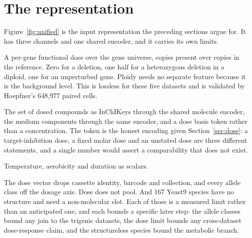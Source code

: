 
\section{The representation}
\label{sec:representation}

Figure~\ref{fig:unified} is the input representation the preceding sections argue for. It has
three channels and one shared encoder, and it carries its own limits.


A per-gene functional dose over the gene universe, copies present over copies in the
reference. Zero for a deletion, one half for a heterozygous deletion in a diploid, one for an
unperturbed gene. Ploidy needs no separate feature because it is the background level. This is
lossless for these five datasets and is validated by Hoepfner's 648{,}977 paired cells.

The set of dosed compounds as InChIKeys through the shared molecule encoder, the medium
components through the same encoder, and a dose basis token rather than a concentration. The
token is the honest encoding given Section~\ref{sec:dose}: a target-inhibition dose, a fixed
molar dose and an unstated dose are three different statements, and a single number would
assert a comparability that does not exist.

Temperature, aerobicity and duration as scalars.

The dose vector drops cassette identity, barcode and collection, and every allele class off
the dosage axis. Dose does not pool. And 167 Yeast9 species have no structure and need a
non-molecular slot. Each of those is a measured limit rather than an anticipated one, and each
bounds a specific later step: the allele classes bound any join to the trigenic datasets, the
dose limit bounds any cross-dataset dose-response claim, and the structureless species bound
the metabolic branch.

